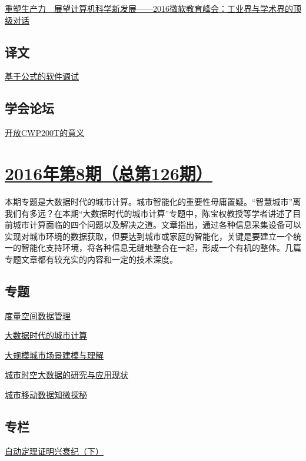 \documentclass[a4paper]{article}
\begin{document}
\href{http://history.ccf.org.cn/resources/1190201776262/2016/09/12/maxin.pdf}{重塑生产力　展望计算机科学新发展——2016微软教育峰会：工业界与学术界的顶级对话}

\subsection{译文}
\href{http://history.ccf.org.cn/resources/1190201776262/2016/09/12/yiwen.pdf}{基于公式的软件调试}

\subsection{学会论坛}
\href{http://history.ccf.org.cn/resources/1190201776262/2016/09/12/lixiaoming.pdf}{开放CWP200T的意义}


\section{\href{http://history.ccf.org.cn/sites/ccf/jsjtbbd.jsp?contentId=2941729697105}{\textbf{2016年第8期（总第126期）}}}
本期专题是大数据时代的城市计算。城市智能化的重要性毋庸置疑。“智慧城市”离我们有多远？在本期“大数据时代的城市计算”专题中，陈宝权教授等学者讲述了目前城市计算面临的四个问题以及解决之道。文章指出，通过各种信息采集设备可以实现对城市环境的数据获取，但要达到城市或家庭的智能化，关键是要建立一个统一的智能化支持环境，将各种信息无缝地整合在一起，形成一个有机的整体。几篇专题文章都有较充实的内容和一定的技术深度。
\subsection{专题}
\href{http://history.ccf.org.cn/resources/1190201776262/2016/08/11/4gaoyunjun.pdf}{度量空间数据管理}

\href{http://history.ccf.org.cn/resources/1190201776262/2016/08/11/1chenbaoquan.pdf}{大数据时代的城市计算}

\href{http://history.ccf.org.cn/resources/1190201776262/2016/08/11/2chenbaoquan.pdf}{大规模城市场景建模与理解}

\href{http://history.ccf.org.cn/resources/1190201776262/2016/08/11/yuxiaohui.pdf}{城市时空大数据的研究与应用现状}

\href{http://history.ccf.org.cn/resources/1190201776262/2016/08/11/5yuanxiaoru.pdf}{城市移动数据知微探秘}

\subsection{专栏}
\href{http://history.ccf.org.cn/resources/1190201776262/2016/08/11/nike.pdf}{自动定理证明兴衰纪（下）}
\end{document}
